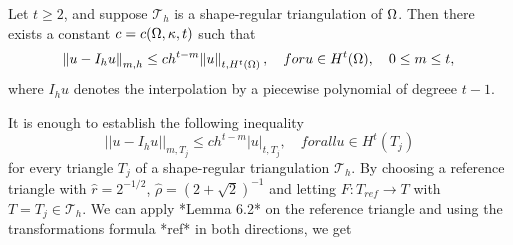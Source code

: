 \begin{thmx}
    Let $t \geq 2$, and suppose $\mathcal{T}_h$ is a shape-regular triangulation of $\Omega$. Then there exists a constant $c = c(\Omega, \kappa, t)$ such that
    \begin{equation}
        \norm{u - I_h u}_{m,h} \leq c h^{t-m} \norm{u}_{t, H^t(\Omega)}, \quad for u \in H^t(\Omega), \quad 0 \leq m \leq t,
    \end{equation}
    where $I_h u$ denotes the interpolation by a piecewise polynomial of degreee $t-1$.
\end{thmx}

\begin{bev}
    It is enough to establish the following inequality
    \begin{equation}
        ||u-I_h u||_{m,T_j} \leq c h^{t-m} |u|_{t,T_j}, \quad for all u \in H^t(T_j)
    \end{equation}
    for every triangle $T_j$ of a shape-regular triangulation $\mathcal{T}_h$. By choosing a reference triangle with $\hat{r} = 2^{-1/2}$, $\hat{\rho} = {(2+\sqrt{2})}^{-1}$ and letting $F : T_{ref} \to T$ with $T = T_j \in \mathcal{T}_h$. We can apply *Lemma 6.2* on the reference triangle and using the transformations formula *ref* in both directions, we get
\end{bev}